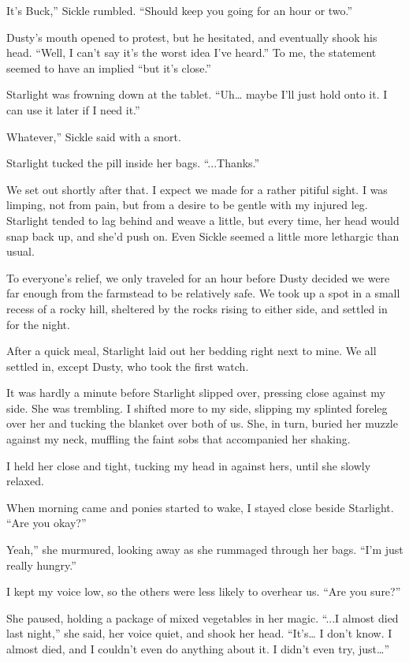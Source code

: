 \leavevmode{}It’s Buck,” Sickle rumbled. “Should keep you going for an hour or two.”

Dusty’s mouth opened to protest, but he hesitated, and eventually shook his head. “Well, I can’t say it’s the worst idea I’ve heard.” To me, the statement seemed to have an implied “but it’s close.”

Starlight was frowning down at the tablet. “Uh… maybe I’ll just hold onto it. I can use it later if I need it.”

\leavevmode{}Whatever,” Sickle said with a snort.

Starlight tucked the pill inside her bags. “...Thanks.”

We set out shortly after that. I expect we made for a rather pitiful sight. I was limping, not from pain, but from a desire to be gentle with my injured leg. Starlight tended to lag behind and weave a little, but every time, her head would snap back up, and she’d push on. Even Sickle seemed a little more lethargic than usual.

To everyone’s relief, we only traveled for an hour before Dusty decided we were far enough from the farmstead to be relatively safe. We took up a spot in a small recess of a rocky hill, sheltered by the rocks rising to either side, and settled in for the night.

After a quick meal, Starlight laid out her bedding right next to mine. We all settled in, except Dusty, who took the first watch.

It was hardly a minute before Starlight slipped over, pressing close against my side. She was trembling. I shifted more to my side, slipping my splinted foreleg over her and tucking the blanket over both of us. She, in turn, buried her muzzle against my neck, muffling the faint sobs that accompanied her shaking.

I held her close and tight, tucking my head in against hers, until she slowly relaxed.

{\br}%
When morning came and ponies started to wake, I stayed close beside Starlight. “Are you okay?”

\leavevmode{}Yeah,” she murmured, looking away as she rummaged through her bags. “I’m just really hungry.”

I kept my voice low, so the others were less likely to overhear us. “Are you sure?”

She paused, holding a package of mixed vegetables in her magic. “...I almost died last night,” she said, her voice quiet, and shook her head. “It’s… I don’t know. I almost died, and I couldn’t even do anything about it. I didn’t even try, just…”

